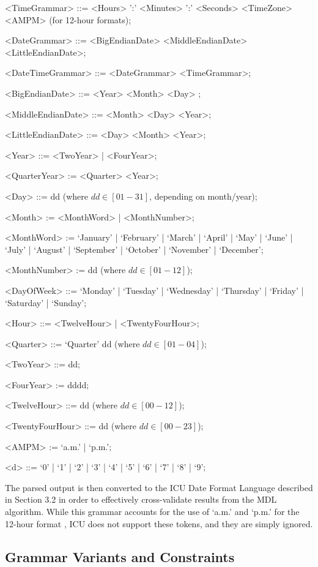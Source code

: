 \begin{grammar}
<TimeGrammar> ::= <Hours> ':' <Minutes> ':' <Seconds> <TimeZone> <AMPM> (for 12-hour formats);

<DateGrammar> ::= <BigEndianDate> 
				\alt <MiddleEndianDate> 
				\alt <LittleEndianDate>;

<DateTimeGrammar>  ::= <DateGrammar> 
					\alt <TimeGrammar>;
					

<BigEndianDate> ::= <Year> <Month>  <Day> ;

<MiddleEndianDate> ::= <Month> <Day> <Year>;

<LittleEndianDate> ::= <Day> <Month> <Year>;

<Year> ::= <TwoYear> | <FourYear>;

<QuarterYear> := <Quarter> <Year>;

<Day>     ::= dd (where $dd \in [01-31]$, depending on month/year);

<Month> := <MonthWord> | <MonthNumber>;

<MonthWord> := `January' | `February' | `March' | `April' | `May' | `June' | `July' | `August' | `September' | `October' | `November' | `December';

<MonthNumber> := dd (where $dd \in [01-12]$);

<DayOfWeek> ::= `Monday' | `Tuesday' | `Wednesday' | `Thursday' | `Friday' | `Saturday' | `Sunday';

<Hour> ::= <TwelveHour> | <TwentyFourHour>;

<Quarter> ::= `Quarter' dd (where $dd \in [01 - 04]$);

<TwoYear> ::= dd;

<FourYear> := dddd;

<TwelveHour> ::= dd (where $dd \in [00-12]$);

<TwentyFourHour> ::= dd (where $dd \in [00 -23]$);

<AMPM> := `a.m.' | `p.m.';

<d> ::= `0' | `1' | `2' | `3' | `4' | `5' | `6' | `7' | `8' | `9';

\end{grammar}


The parsed output is then converted to the ICU Date Format Language described in Section 3.2 in order to effectively cross-validate results from the MDL algorithm. While this grammar accounts for the use of `a.m.' and `p.m.' for the 12-hour format , ICU does not support these tokens, and they are simply ignored.

\subsection{Grammar Variants and Constraints}

